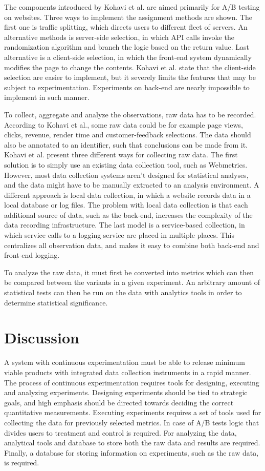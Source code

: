 \documentclass[conference]{IEEEtran}
\begin{document}
The components introduced by Kohavi et al. are aimed primarily for A/B testing on websites. Three ways to implement the assignment methods are shown. The first one is traffic splitting, which directs users to different fleet of servers. An alternative methods is server-side selection, in which API calls invoke the randomization algorithm and branch the logic based on the return value. Last alternative is a client-side selection, in which the front-end system dynamically modifies the page to change the contents. Kohavi et al. state that the client-side selection are easier to implement, but it severely limits the features that may be subject to experimentation. Experiments on back-end are nearly impossible to implement in such manner.

To collect, aggregate and analyze the observations, raw data has to be recorded. According to Kohavi et al., some raw data could be for example page views, clicks, revenue, render time and customer-feedback selections. The data should also be annotated to an identifier, such that conclusions can be made from it. Kohavi et al. present three different ways for collecting raw data. The first solution is to simply use an existing data collection tool, such as Webmetrics. However, most data collection systems aren't designed for statistical analyses, and the data might have to be manually extracted to an analysis environment. A different approach is local data collection, in which a website records data in a local database or log files. The problem with local data collection is that each additional source of data, such as the back-end, increases the complexity of the data recording infrastructure. The last model is a service-based collection, in which service calls to a logging service are placed in multiple places. This centralizes all observation data, and makes it easy to combine both back-end and front-end logging.  

To analyze the raw data, it must first be converted into metrics which can then be compared between the variants in a given experiment. An arbitrary amount of statistical tests can then be run on the data with analytics tools in order to determine statistical significance. 

\section{Discussion} %

A system with continuous experimentation must be able to release minimum viable products with integrated data collection instruments in a rapid manner. The process of continuous experimentation requires tools for designing, executing and analyzing experiments. Designing experiments should be tied to strategic goals, and high emphasis should be directed towards deciding the correct quantitative measurements. Executing experiments requires a set of tools used for collecting the data for previously selected metrics. In case of A/B tests logic that divides users to treatment and control is required. For analyzing the data, analytical tools and database to store both the raw data and results are required. Finally, a database for storing information on experiments, such as the raw data, is required.
\end{document}
